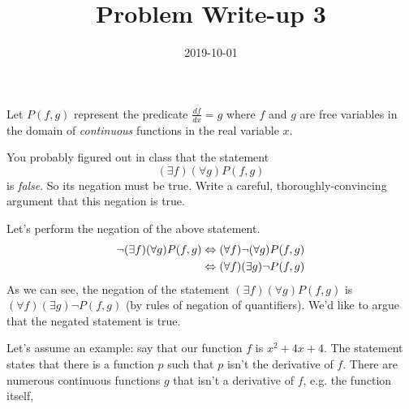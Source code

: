 \documentclass[a4paper,12pt]{article}
\title{Problem Write-up 3}
\date{2019-10-01}
\begin{document}
    \begin{problem}
        Let \(P(f,g)\) represent the predicate \(\frac{df}{dx} = g\) where \(f\) and \(g\) are free variables in the domain of \textit{continuous} functions in the real variable \(x\).

        You probably figured out in class that the statement \[(\exists f)(\forall g) P(f,g)\] is \textit{false}. So its negation must be true. Write a careful, thoroughly-convincing argument that this negation is true.

    \end{problem}
    \begin{answer}
        Let's perform the negation of the above statement.
        \begin{align*}
            \neg (\exists f)(\forall g) P(f,g) &\Leftrightarrow (\forall f) \neg (\forall g) P(f,g) \\
            &\Leftrightarrow (\forall f) (\exists g) \neg P(f,g)
        \end{align*}
        As we can see, the negation of the statement \((\exists f)(\forall g) P(f,g)\) is \((\forall f) (\exists g) \neg P(f,g)\) (by rules of negation of quantifiers). We'd like to argue that the negated statement is true.

        Let's assume an example: say that our function \(f\) is \(x^2 + 4x + 4\). The statement states that there is a function \(p\) such that \(p\) isn't the derivative of \(f\). There are numerous continuous functions \(g\) that isn't a derivative of \(f\), e.g. the function itself, 
    \end{answer}
\end{document}
